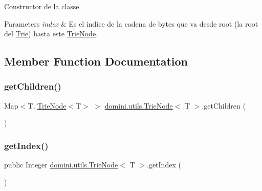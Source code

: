 Constructor de la classe. 


\begin{DoxyParams}{Parameters}
{\em index} & Es el indice de la cadena de bytes que va desde root (la root del \hyperlink{classdomini_1_1utils_1_1Trie}{Trie}) hasta este \hyperlink{classdomini_1_1utils_1_1TrieNode}{Trie\+Node}. \\
\hline
\end{DoxyParams}


\subsection{Member Function Documentation}
\mbox{\label{classdomini_1_1utils_1_1TrieNode_ace4e12a6dd51d77d6d24447eca520478}} 
\subsubsection{\texorpdfstring{get\+Children()}{getChildren()}}
{\footnotesize\ttfamily Map$<$T, \hyperlink{classdomini_1_1utils_1_1TrieNode}{Trie\+Node}$<$T$>$ $>$ \hyperlink{classdomini_1_1utils_1_1TrieNode}{domini.\+utils.\+Trie\+Node}$<$ T $>$.get\+Children (\begin{DoxyParamCaption}{ }\end{DoxyParamCaption})\hspace{0.3cm}{\ttfamily [inline]}}

\mbox{\label{classdomini_1_1utils_1_1TrieNode_ac8e79df6ce5e7b33c6d08a0fe0681916}} 
\subsubsection{\texorpdfstring{get\+Index()}{getIndex()}}
{\footnotesize\ttfamily public Integer \hyperlink{classdomini_1_1utils_1_1TrieNode}{domini.\+utils.\+Trie\+Node}$<$ T $>$.get\+Index (\begin{DoxyParamCaption}{ }\end{DoxyParamCaption})\hspace{0.3cm}{\ttfamily [inline]}}

